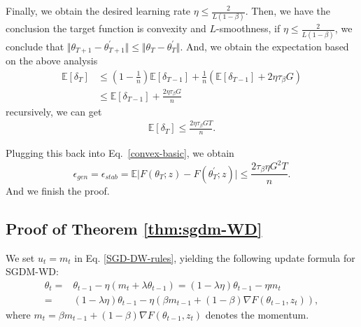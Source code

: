 Finally, we obtain the desired learning rate $\eta \leq \frac{2}{L(1-\beta)}$. Then, we have the conclusion the target function is convexity and $L$-smoothness, if $\eta \leq \frac{2}{L(1-\beta)}$, we conclude that $\Vert \theta_{T+1} - \theta_{T+1}^{\prime}\Vert \leq \Vert \theta_T- \theta_T^{\prime}\Vert$. And, we obtain the expectation based on the above analysis 
  \begin{equation}
  \begin{aligned}
    \mathbb{E}\left[\delta_{T}\right] &\leq (1-\frac{1}{n})\mathbb{E}\left[\delta_{T-1}\right] + \frac{1}{n}\left(\mathbb{E}\left[\delta_{T-1}\right] + 2\eta\tau_{\beta} G\right)\\
    &\leq \mathbb{E}\left[\delta_{T-1}\right] + \frac{2\eta\tau_{\beta} G}{n}
  \end{aligned}
 \end{equation}
recursively, we can get 
    \begin{equation}
     \begin{aligned}
      \mathbb{E}\left[\delta_{T}\right] \leq \frac{2\eta\tau_{\beta} G T}{n} .
     \end{aligned}
    \end{equation}

Plugging this back into Eq.~\eqref{convex-basic}, we obtain
 \begin{equation}\label{eq:2.2.1}
  \epsilon_{gen} = \epsilon_{stab} = \mathbb{E}\vert F(\theta_T;z) - F(\theta^{\prime}_T;z)\vert \leq \frac{2\tau_{\beta}\eta G^2 T}{n}.
 \end{equation}
And we finish the proof.

\subsection{Proof of Theorem \ref{thm:sgdm-WD}}\label{sec:app-thm:sgdm-wd}

We set $u_t = m_t$ in Eq. \ref{SGD-DW-rules}, yielding the following update formula for SGDM-WD: 
\begin{equation}
  \begin{aligned}
   \theta_t = & \theta_{t-1} - \eta (m_t + \lambda \theta_{t-1} ) = (1-\lambda \eta) \theta_{t-1} - \eta m_t \\
   = & (1-\lambda \eta) \theta_{t-1} - \eta (\beta m_{t-1}+(1-\beta)\nabla F(\theta_{t-1},z_t)),
  \end{aligned}
 \end{equation}
where $m_t = \beta m_{t-1}+(1-\beta)\nabla F(\theta_{t-1},z_t)$ denotes the momentum.

